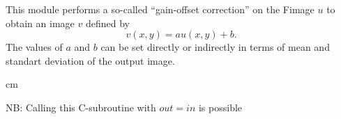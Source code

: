 
This module performs a so-called ``gain-offset correction'' on the Fimage
$u$ to obtain an image $v$ defined by 
$$v(x,y) = a u(x,y) + b.$$
The values of $a$ and $b$ can be set directly or indirectly in terms
of mean and standart deviation of the output image.

 cm

NB: Calling this C-subroutine with $out=in$ is possible
